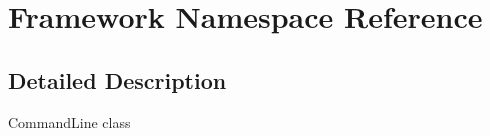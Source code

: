\hypertarget{namespace_framework}{
\section{\-Framework \-Namespace \-Reference}
\label{namespace_framework}
}


\subsection{\-Detailed \-Description}
\-Command\-Line class 